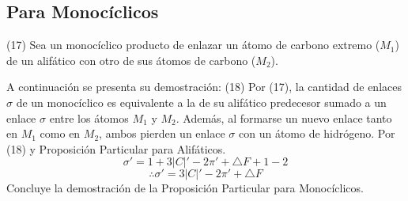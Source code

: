 \documentclass{article}
\begin{document}
\subsection{Para Monocíclicos}
(17) Sea un monocíclico producto de enlazar un átomo de carbono extremo ($M_1$) de un alifático con otro de sus átomos de carbono ($M_2$).
\newtheorem{myteo7}{Teorema} 
\begin{center} 
\end{center}
A continuación se presenta su demostración:\newline \newline
(18) Por (17), la cantidad de enlaces $\sigma$ de un monocíclico es equivalente a la de su alifático predecesor sumado a un enlace $\sigma$ entre los átomos $M_1$ y $M_2$. Además, al formarse un nuevo enlace tanto en $M_1$ como en $M_2$, ambos pierden un enlace $\sigma$ con un átomo de hidrógeno. \newline\newline
Por (18) y Proposición Particular para Alifáticos.
$$\sigma'=1+3|C|'-2\pi'+\bigtriangleup F+1-2$$
\begin{equation}
\therefore\sigma'=3|C|'-2\pi'+\bigtriangleup F
\end{equation}\newline
Concluye la demostración de la Proposición Particular para Monocíclicos.
\end{document}
